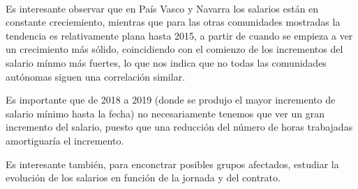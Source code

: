 \documentclass[11pt]{article}
\begin{document}
    \begin{center}
    \end{center}
    { \hspace*{\fill} \\}
    
    Es interesante observar que en País Vasco y Navarra los salarios están
en constante creciemiento, mientras que para las otras comunidades
mostradas la tendencia es relativamente plana hasta 2015, a partir de
cuando se empieza a ver un crecimiento más sólido, coincidiendo con el
comienzo de los incrementos del salario mínmo más fuertes, lo que nos
indica que no todas las comunidades autónomas siguen una correlación
similar.

Es importante que de 2018 a 2019 (donde se produjo el mayor incremento
de salario mínimo hasta la fecha) no necesariamente tenemos que ver un
gran incremento del salario, puesto que una reducción del número de
horas trabajadas amortiguaría el incremento.

    Es interesante también, para enconctrar posibles grupos afectados,
estudiar la evolución de los salarios en función de la jornada y del
contrato.
\end{document}
